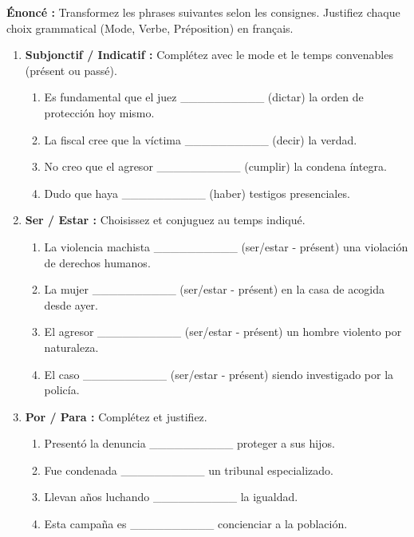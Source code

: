 \documentclass[11pt]{article}
\begin{document}
\begin{exoresolu}
\textbf{Énoncé :} Transformez les phrases suivantes selon les consignes. Justifiez chaque choix grammatical (Mode, Verbe, Préposition) en français.

\begin{enumerate}
    \item \textbf{Subjonctif / Indicatif :} Complétez avec le mode et le temps convenables (présent ou passé).
    \begin{enumerate}
        \item Es fundamental que el juez \_\_\_\_\_\_\_\_\_\_ (dictar) la orden de protección hoy mismo.
        \item La fiscal cree que la víctima \_\_\_\_\_\_\_\_\_\_ (decir) la verdad.
        \item No creo que el agresor \_\_\_\_\_\_\_\_\_\_ (cumplir) la condena íntegra.
        \item Dudo que haya \_\_\_\_\_\_\_\_\_\_ (haber) testigos presenciales.
    \end{enumerate}
    \item \textbf{Ser / Estar :} Choisissez et conjuguez au temps indiqué.
    \begin{enumerate}
        \item La violencia machista \_\_\_\_\_\_\_\_\_\_ (ser/estar - présent) una violación de derechos humanos.
        \item La mujer \_\_\_\_\_\_\_\_\_\_ (ser/estar - présent) en la casa de acogida desde ayer.
        \item El agresor \_\_\_\_\_\_\_\_\_\_ (ser/estar - présent) un hombre violento por naturaleza.
        \item El caso \_\_\_\_\_\_\_\_\_\_ (ser/estar - présent) siendo investigado por la policía.
    \end{enumerate}
    \item \textbf{Por / Para :} Complétez et justifiez.
    \begin{enumerate}
        \item Presentó la denuncia \_\_\_\_\_\_\_\_\_\_ proteger a sus hijos.
        \item Fue condenada \_\_\_\_\_\_\_\_\_\_ un tribunal especializado.
        \item Llevan años luchando \_\_\_\_\_\_\_\_\_\_ la igualdad.
        \item Esta campaña es \_\_\_\_\_\_\_\_\_\_ concienciar a la población.
    \end{enumerate}
\end{enumerate}


\end{exoresolu}
\end{document}
